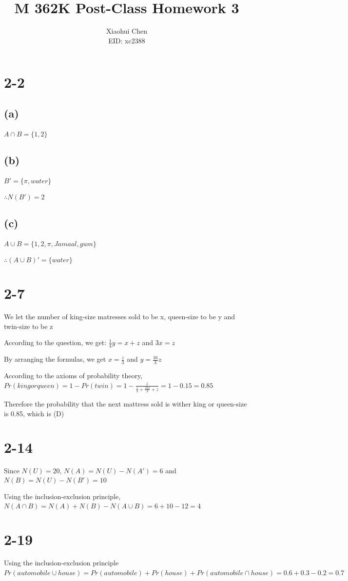 \documentclass[12pt]{article}
\author{Xiaohui Chen \\EID: xc2388}
\title{M 362K Post-Class Homework 3}
\begin{document}
\maketitle
\begin{spacing}{2.0}

\section*{2-2}
\subsection*{(a)}
$A\cap B=\{1,2\}$

\subsection*{(b)}
$B'=\{\pi,water\}$

$\therefore N(B')=2$

\subsection*{(c)}
$A\cup B=\{1,2,\pi,Jamaal,gum\}$

$\therefore (A\cup B)'=\{water\}$

\section*{2-7}
We let the number of king-size matresses sold to be x, queen-size to be y and twin-size to be z

According to the question, we get: $\frac{1}{4}y=x+z$ and $3x=z$

By arranging the formulas, we get $x=\frac{z}{3}$ and $y=\frac{16}{3}z$

According to the axioms of probability theory, $Pr(king or queen)=1-Pr(twin)=1-\frac{z}{\frac{z}{3}+ \frac{16z}{3}+z}= 1-0.15= 0.85$

Therefore the probability that the next mattress sold is wither king or queen-size is 0.85, which is (D)

\section*{2-14}
Since $N(U)=20$, $N(A)=N(U)-N(A')=6$ and $N(B)=N(U)-N(B')=10$

Using the inclusion-exclusion principle, $N(A\cap B)= N(A)+N(B)-N(A\cup B)=6+10-12=4$

\section*{2-19}
Using the inclusion-exclusion principle $Pr(automobile\cup house)=Pr(automobile)+ Pr(house)+ Pr(automobile\cap house)= 0.6+0.3-0.2= 0.7$


\end{spacing}
\end{document}
